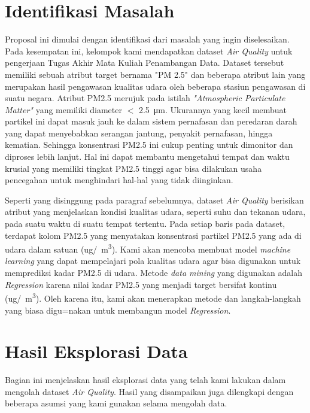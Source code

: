 \documentclass{article}
\begin{document}
    \begin{normalsize}
        
        \section{Identifikasi Masalah}
        Proposal ini dimulai dengan identifikasi dari masalah yang ingin diselesaikan. 
        Pada kesempatan ini, kelompok kami mendapatkan dataset \textit{Air Quality} 
        untuk pengerjaan Tugas Akhir Mata Kuliah Penambangan Data. Dataset tersebut memiliki 
        sebuah atribut target bernama "PM 2.5" dan beberapa atribut lain yang merupakan hasil 
        pengawasan kualitas udara oleh beberapa stasiun pengawasan di suatu negara. Atribut 
        PM2.5 merujuk pada istilah \textit{"Atmospheric Particulate Matter"} yang memiliki
        diameter $<$ \SI{2.5}{\micro\metre}. Ukurannya yang kecil membuat partikel ini dapat 
        masuk jauh ke dalam sistem pernafasan dan peredaran darah yang dapat menyebabkan 
        serangan jantung, penyakit pernafasan, hingga kematian. Sehingga konsentrasi PM2.5
        ini cukup penting untuk dimonitor dan diproses lebih lanjut. Hal ini dapat membantu 
        mengetahui tempat dan waktu krusial yang memiliki tingkat PM2.5 tinggi agar bisa
        dilakukan usaha pencegahan untuk menghindari hal-hal yang tidak diinginkan.

        \noindent Seperti yang disinggung pada paragraf sebelumnya, dataset \textit{Air Quality}
        berisikan atribut yang menjelaskan kondisi kualitas udara, seperti suhu dan tekanan udara,
        pada suatu waktu di suatu tempat tertentu. Pada setiap baris pada dataset, terdapat kolom
        PM2.5 yang menyatakan konsentrasi partikel PM2.5 yang ada di udara dalam satuan 
        (ug/\SI{}{\metre\cubed}). Kami akan mencoba membuat model \textit{machine learning} yang 
        dapat mempelajari pola kualitas udara agar bisa digunakan untuk memprediksi kadar PM2.5 
        di udara. Metode \textit{data mining} yang digunakan adalah \textit{Regression} karena 
        nilai kadar PM2.5 yang menjadi target bersifat kontinu (ug/\SI{}{\metre\cubed}). Oleh
        karena itu, kami akan menerapkan metode dan langkah-langkah yang biasa digu=nakan untuk
        membangun model \textit{Regression}.

        \section{Hasil Eksplorasi Data}
        Bagian ini menjelaskan hasil eksplorasi data yang telah kami lakukan dalam mengolah 
        dataset \textit{Air Quality}. Hasil yang disampaikan juga dilengkapi dengan beberapa
        asumsi yang kami gunakan selama mengolah data.
        

\end{normalsize}
\end{document}
